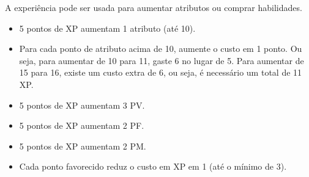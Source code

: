 A experiência pode ser usada para aumentar atributos ou comprar habilidades. 

\begin{itemize}
\item 5 pontos de XP aumentam 1 atributo (até 10).
\item Para cada ponto de atributo acima de 10, aumente o custo em 1 ponto. Ou seja, para aumentar de 10 para 11, gaste 6 no lugar de 5. Para aumentar de 15 para 16, existe um custo extra de 6, ou seja, é necessário um total de 11 XP.
\item 5 pontos de XP aumentam 3 PV.
\item 5 pontos de XP aumentam 2 PF.
\item 5 pontos de XP aumentam 2 PM.
\item Cada ponto favorecido reduz o custo em XP em 1 (até o mínimo de 3).
\end{itemize}





